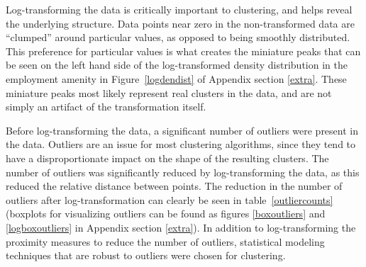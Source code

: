 \documentclass[11pt, a4paper]{article}
\begin{document}
Log-transforming the data is critically important to clustering, and helps reveal the underlying structure. Data points near zero in the non-transformed data are ``clumped'' around particular values, as opposed to being smoothly distributed. This preference for particular values is what creates the miniature peaks that can be seen on the left hand side of the log-transformed density distribution in the employment amenity in Figure~\ref{logdendist} of Appendix section \ref{extra}. These miniature peaks most likely represent real clusters in the data, and are not simply an artifact of the transformation itself.
\par
Before log-transforming the data, a significant number of outliers were present in the data. Outliers are an issue for most clustering algorithms, since they tend to have a disproportionate impact on the shape of the resulting clusters. The number of outliers was significantly reduced by log-transforming the data, as this reduced the relative distance between points. The reduction in the number of outliers after log-transformation can clearly be seen in table~\ref{outliercounts} (boxplots for visualizing outliers can be found as figures \ref{boxoutliers} and \ref{logboxoutliers} in Appendix section \ref{extra}). In addition to log-transforming the proximity measures to reduce the number of outliers, statistical modeling techniques that are robust to outliers were chosen for clustering.




\begin{table}[h]
\centering
\caption[Number of outliers]{The number of outliers in each amenity in the PMD before and after log-transformation.}\label{outliercounts}
\end{table}
\end{document}
